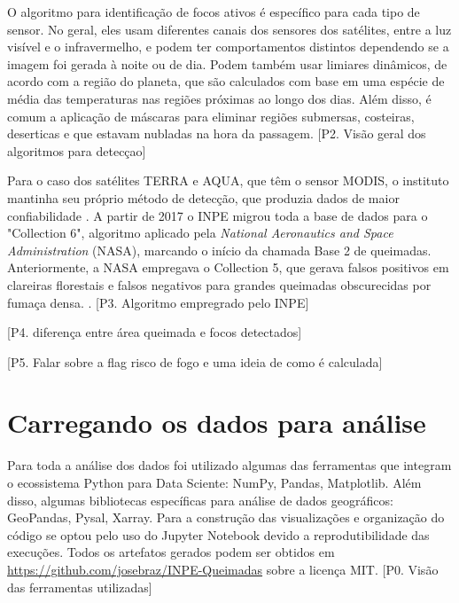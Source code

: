 \documentclass[cic,tc]{iiufrgs}
\begin{document}
O algoritmo para identificação de focos ativos é específico para cada tipo 
de sensor. No geral, eles usam diferentes canais dos sensores dos 
satélites, entre a luz visível e o infravermelho, e podem ter comportamentos 
distintos dependendo se a imagem foi gerada à noite ou de dia. Podem também 
usar limiares dinâmicos, de acordo com a região do planeta, que são calculados com 
base em uma espécie de média das temperaturas nas regiões próximas ao longo dos 
dias. Além disso, é comum a aplicação de máscaras para eliminar regiões submersas, 
costeiras, deserticas e que estavam nubladas na hora da passagem. 
[P2. Visão geral dos algoritmos para detecçao] \par

Para o caso dos satélites TERRA e AQUA, que têm o sensor MODIS, o 
instituto mantinha seu próprio método de detecção, que produzia dados de 
maior confiabilidade \citep{PerguntasFrequentesINPE}. 
A partir de 2017 o INPE migrou toda a base de dados para o "Collection 6", 
algoritmo aplicado pela \textit{National Aeronautics and Space Administration} 
(NASA), marcando o início da chamada Base 2 de queimadas. Anteriormente, a NASA 
empregava o Collection 5, que gerava falsos positivos em clareiras florestais e 
falsos negativos para grandes queimadas obscurecidas por fumaça densa.
\citep{SCHROEDER2008}. [P3. Algoritmo empregrado pelo INPE] \par



[P4. diferença entre área queimada e focos detectados] \par

[P5. Falar sobre a flag risco de fogo e uma ideia de como é calculada] \par

\section{Carregando os dados para análise} 

Para toda a análise dos dados foi utilizado algumas das ferramentas que integram o 
ecossistema Python para Data Sciente: NumPy, Pandas, Matplotlib. Além disso, 
algumas bibliotecas específicas para análise de dados geográficos: GeoPandas, 
Pysal, Xarray. Para a construção das visualizações e organização do código se 
optou pelo uso do Jupyter Notebook devido a reprodutibilidade das execuções. 
Todos os artefatos gerados podem ser obtidos em 
\url{https://github.com/josebraz/INPE-Queimadas} sobre a licença MIT. 
[P0. Visão das ferramentas utilizadas]\par
\end{document}
